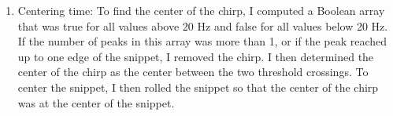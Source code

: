 \begin{enumerate}
\begin{enumerate}
    \end{enumerate}

  \item Centering time: To find the center of the chirp, I computed a Boolean
    array that was true for all values above 20 \si{\hertz} and false for all
    values below 20 \si{\hertz}. If the number of peaks in this array was more
    than 1, or if the peak reached up to one edge of the snippet, I removed
    the chirp. I then determined the center of the chirp as the center between
    the two threshold crossings. To center the snippet, I then rolled the
    snippet so that the center of the chirp was at the center of the snippet.

\end{enumerate}

